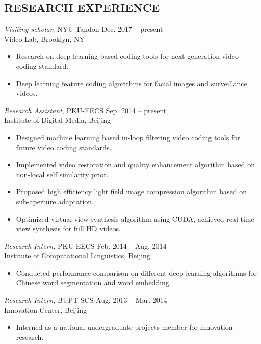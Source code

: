 \documentclass[margin, 10pt]{res} %
\begin{document}
\begin{resume}

\section{RESEARCH EXPERIENCE}

{\sl Visiting scholar}, NYU-Tandon \hfill {Dec. 2017 -- present} \\
Video Lab, Brooklyn, NY

\begin{itemize} \itemsep -2pt %
\item Research on deep learning based coding tools for next generation video coding standard.
\item Deep learning feature coding algorithms for facial images and surveillance videos.
\end{itemize}

{\sl Research Assistant}, PKU-EECS \hfill {Sep. 2014 -- present} \\
Institute of Digital Media, Beijing

\begin{itemize} \itemsep -2pt
\item{Designed machine learning based in-loop filtering video coding tools for future video coding standards.}
\item{Implemented video restoration and quality enhancement algorithm based on non-local self similarity prior.}
\item{Proposed high efficiency light field image compression algorithm based on sub-aperture adaptation.}
\item{Optimized virtual-view synthesis algorithm using CUDA, achieved real-time view synthesis for full HD videos.}
\end{itemize}

{\sl Research Intern}, PKU-EECS \hfill {Feb. 2014 -- Aug. 2014} \\
Institute of Computational Linguistics, Beijing
\begin{itemize}  \itemsep -2pt
\item{Conducted performance comparison on different deep learning algorithms for Chinese word segmentation and word embedding.}
\end{itemize}

{\sl Research Intern}, BUPT-SCS \hfill {Aug. 2013 -- Mar. 2014} \\
Innovation Center, Beijing
\begin{itemize}
\item{Interned as a national undergraduate projects member for innovation research.}
\end{itemize}


\end{resume}
\end{document}
